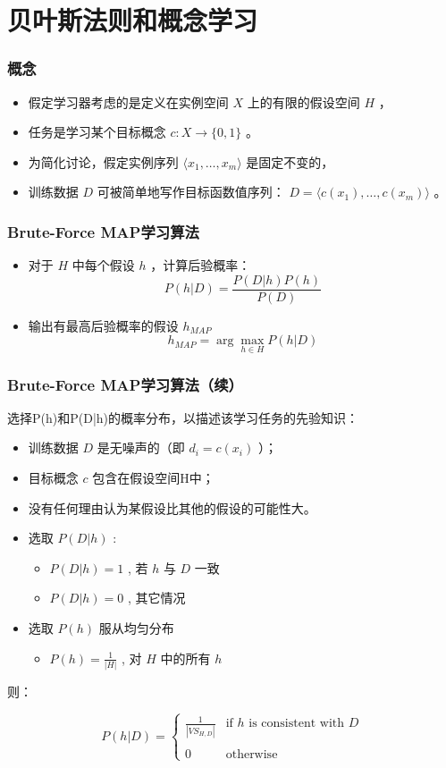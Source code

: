 \documentclass{beamer}
\begin{document}
\section{贝叶斯法则和概念学习}
\label{sec-3}
\begin{frame}
\frametitle{概念}
\label{sec-3-1}

\begin{itemize}
\item 假定学习器考虑的是定义在实例空间 $X$ 上的有限的假设空间 $H$ ，
\item 任务是学习某个目标概念 $c:X\rightarrow \{0,1\}$ 。
\item 为简化讨论，假定实例序列 $\langle x_{1}, \ldots, x_{m}\rangle$ 是固定不变的，
\item 训练数据 $D$ 可被简单地写作目标函数值序列： $D = \langle c(x_{1}),\ldots, c(x_{m})\rangle$  。
\end{itemize}
\end{frame}
\begin{frame}
\frametitle{Brute-Force MAP学习算法}
\label{sec-3-2}

\begin{itemize}
\item 对于 $H$ 中每个假设 $h$ ，计算后验概率：
  $$P(h|D) = \frac{P(D|h) P(h)}{P(D)}$$
\item 输出有最高后验概率的假设 $h_{MAP}$ 
  $$h_{MAP} = \arg \max_{h \in H} P(h|D)$$
\end{itemize}
\end{frame}
\begin{frame}
\frametitle{Brute-Force MAP学习算法（续）}
\label{sec-3-3}

选择P(h)和P(D|h)的概率分布，以描述该学习任务的先验知识：
\begin{itemize}
\item 训练数据 $D$ 是无噪声的（即 $d_i=c(x_i)$ ）；
\item 目标概念 $c$ 包含在假设空间H中；
\item 没有任何理由认为某假设比其他的假设的可能性大。
\item 选取 $P(D|h)$ :
\begin{itemize}
\item $P(D|h)=1$ , 若 $h$ 与 $D$ 一致
\item $P(D|h)=0$ , 其它情况
\end{itemize}
\item 选取 $P(h)$ 服从均匀分布
\begin{itemize}
\item $P(h) = \frac{1}{|H|}$ , 对 $H$ 中的所有 $h$
\end{itemize}
\end{itemize}

则：

\begin{equation*}
P(h|D) = \left\{ \begin{array}{cl}
  \frac{1}{|VS_{H,D}|} & \mbox{if $h$ is consistent with $D$} \\
\\
  0  & \mbox{otherwise} 
\end{array} \right.
\end{equation*}
\end{frame}
\end{document}
